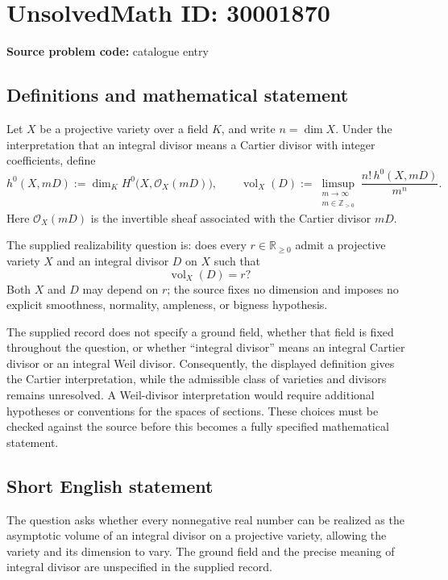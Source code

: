 \documentclass[11pt]{article}
\newcommand{\Z}{\mathbb{Z}}
\newcommand{\R}{\mathbb{R}}
\begin{document}
\section*{UnsolvedMath ID: 30001870}
\textbf{Source problem code:} catalogue entry
\subsection{Definitions and mathematical statement}
Let \(X\) be a projective variety over a field \(K\), and write \(n=\dim X\). Under the interpretation that an integral divisor means a Cartier divisor with integer coefficients, define
\[
 h^0(X,mD):=\dim_K H^0\bigl(X,\mathcal O_X(mD)\bigr),
 \qquad
 \operatorname{vol}_X(D):=
 \limsup_{\substack{m\to\infty\\m\in\Z_{>0}}}
 \frac{n!\,h^0(X,mD)}{m^n}.
\]
Here \(\mathcal O_X(mD)\) is the invertible sheaf associated with the Cartier divisor \(mD\).

The supplied realizability question is: does every \(r\in\R_{\geq 0}\) admit a projective variety \(X\) and an integral divisor \(D\) on \(X\) such that
\[
 \operatorname{vol}_X(D)=r?
\]
Both \(X\) and \(D\) may depend on \(r\); the source fixes no dimension and imposes no explicit smoothness, normality, ampleness, or bigness hypothesis.

The supplied record does not specify a ground field, whether that field is fixed throughout the question, or whether ``integral divisor'' means an integral Cartier divisor or an integral Weil divisor. Consequently, the displayed definition gives the Cartier interpretation, while the admissible class of varieties and divisors remains unresolved. A Weil-divisor interpretation would require additional hypotheses or conventions for the spaces of sections. These choices must be checked against the source before this becomes a fully specified mathematical statement.
\subsection{Short English statement}
The question asks whether every nonnegative real number can be realized as the asymptotic volume of an integral divisor on a projective variety, allowing the variety and its dimension to vary. The ground field and the precise meaning of integral divisor are unspecified in the supplied record.
\end{document}
